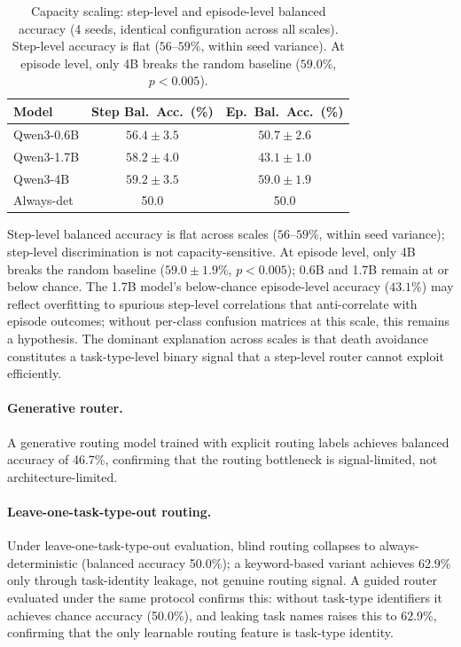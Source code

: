 \documentclass[11pt]{article}
\begin{document}
\begin{table}[h]
\centering
\small
\begin{tabular}{@{}lcc@{}}
\toprule
Model & Step Bal.\ Acc.\ (\%) & Ep.\ Bal.\ Acc.\ (\%) \\
\midrule
Qwen3-0.6B & $56.4 \pm 3.5$ & $50.7 \pm 2.6$ \\
Qwen3-1.7B & $58.2 \pm 4.0$ & $43.1 \pm 1.0$ \\
Qwen3-4B & $59.2 \pm 3.5$ & $\mathbf{59.0 \pm 1.9}$ \\
\midrule
Always-det & 50.0 & 50.0 \\
\bottomrule
\end{tabular}
\caption{Capacity scaling: step-level and episode-level balanced accuracy (4 seeds, identical configuration across all scales). Step-level accuracy is flat ($56$--$59\%$, within seed variance). At episode level, only 4B breaks the random baseline ($59.0\%$, $p < 0.005$).}
\label{tab:capacity}
\end{table}

Step-level balanced accuracy is flat across scales ($56$--$59\%$, within seed variance); step-level discrimination is not capacity-sensitive. At episode level, only 4B breaks the random baseline ($59.0 \pm 1.9\%$, $p < 0.005$); 0.6B and 1.7B remain at or below chance. The 1.7B model's below-chance episode-level accuracy ($43.1\%$) may reflect overfitting to spurious step-level correlations that anti-correlate with episode outcomes; without per-class confusion matrices at this scale, this remains a hypothesis. The dominant explanation across scales is that death avoidance constitutes a task-type-level binary signal that a step-level router cannot exploit efficiently.

\paragraph{Generative router.} A generative routing model trained with explicit routing labels achieves balanced accuracy of 46.7\%, confirming that the routing bottleneck is signal-limited, not architecture-limited.

\paragraph{Leave-one-task-type-out routing.} Under leave-one-task-type-out evaluation, blind routing collapses to always-deterministic (balanced accuracy 50.0\%); a keyword-based variant achieves 62.9\% only through task-identity leakage, not genuine routing signal. A guided router evaluated under the same protocol confirms this: without task-type identifiers it achieves chance accuracy (50.0\%), and leaking task names raises this to 62.9\%, confirming that the only learnable routing feature is task-type identity.
\end{document}
